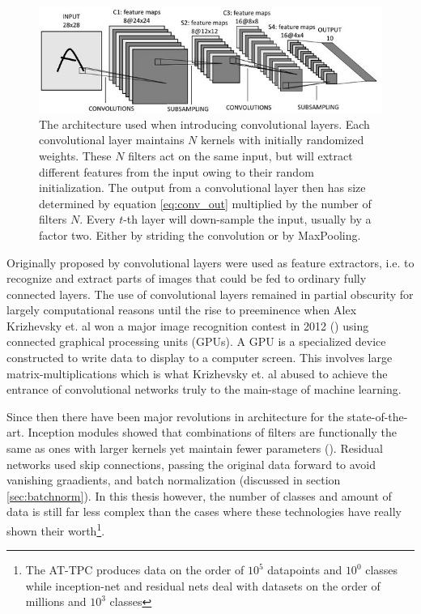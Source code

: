\begin{figure}
\centering
\includegraphics[width=\textwidth]{../figures/lenet5}
\caption[Original LeNet architecture]{The architecture \citet{Lecun1998} used when introducing convolutional layers. Each convolutional layer maintains $N$ kernels with initially randomized weights. These $N$ filters act on the same input, but will extract different features from the input owing to their random initialization. The output from a convolutional layer then has size determined by equation \ref{eq:conv_out} multiplied by the number of filters $N$. Every $t$-th layer will down-sample the input, usually by a factor two. Either by striding the convolution or by MaxPooling.}\label{fig:lenet5}
\end{figure}

Originally proposed by \citet{Lecun1998} convolutional layers were used as feature extractors, i.e. to recognize and extract parts of images that could be fed to ordinary fully connected layers. The use of convolutional layers remained in partial obscurity for largely computational reasons until the rise to preeminence when Alex Krizhevsky et. al won a major image recognition contest in 2012 (\cite{Krizhevsky2012}) using connected graphical processing units (GPUs). A GPU is a specialized device constructed to write data to display to a computer screen. This involves large matrix-multiplications which is what Krizhevsky et. al abused to achieve the entrance of convolutional networks truly to the main-stage of machine learning. 

Since then there have been major revolutions in architecture for the state-of-the-art. Inception modules showed that combinations of filters are functionally the same as ones with larger kernels yet maintain fewer parameters (\cite{Szegedy2014}). Residual networks used skip connections, passing the original data forward to avoid vanishing graadients, and batch normalization (discussed in section \ref{sec:batchnorm}). In this thesis however, the number of classes and amount of data is still far less complex than the cases where these technologies have really shown their worth\footnote{The AT-TPC produces data on the order of $10^5$ datapoints and $10^0$ classes while inception-net and residual nets deal with datasets on the order of millions and $10^3$ classes}.

